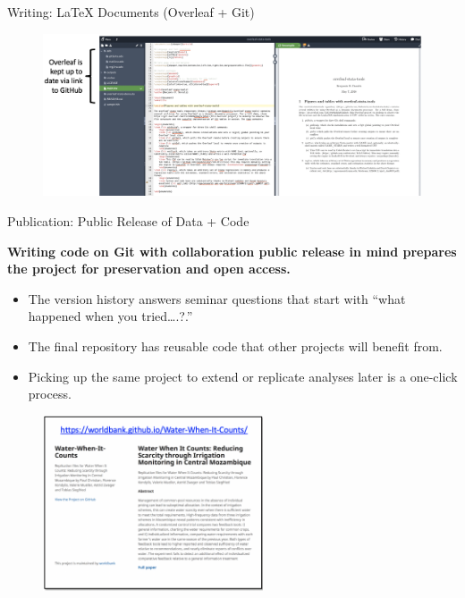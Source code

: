\documentclass[aspectratio=169]{beamer}
\begin{document}
\begin{frame}{Writing: LaTeX Documents (Overleaf + Git)}
\begin{figure}
	\centering
	\includegraphics[width=\linewidth]{img/Writing}
\end{figure}
\end{frame}


\begin{frame}[fragile]{Publication: Public Release of Data + Code}
\begin{multicols}{2}	
	
	\textbf {Writing code on Git with collaboration public release in mind prepares the project for preservation and open access.}
	
	\begin{itemize}[<default overlay specification>]
		\item<1> The version history answers seminar questions that start with “what happened when you tried….?.”
		\item<1>  The final repository has reusable code that other projects will benefit from.
		\item<1>  Picking up the same project to extend or replicate analyses later is a one-click process. 
	\end{itemize}
	
	\begin{figure}
		\centering
		\includegraphics[width=65mm, right]{img/Structure4}
	\end{figure}
	
\end{multicols}
\end{frame}
\end{document}
